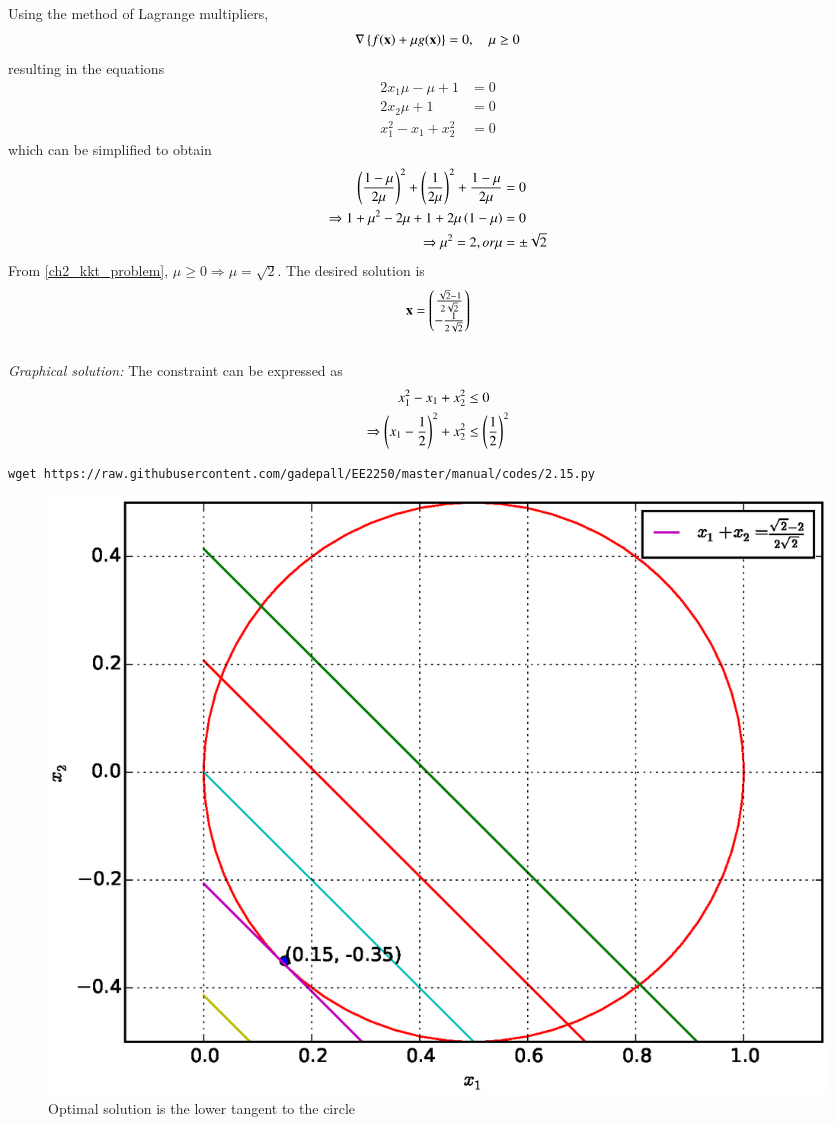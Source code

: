 \documentclass[journal,12pt,twocolumn]{IEEEtran}
\renewcommand\thesection{\arabic{section}}
\begin{document}
\begin{enumerate}[label=\thesection.\arabic*,ref=\thesection.\theenumi]
\solution Using the method of Lagrange multipliers,
%
\begin{align}
\label{ch2_sd_kkt}
\nabla \left\{f(\mathbf{x})  +  \mu g(\mathbf{x}) \right\}= 0 , \quad \mu \ge 0
\end{align}
%
resulting in the equations
%
\begin{align}
2x_1\mu -\mu + 1 &= 0 \\
2x_2\mu + 1 &=0 \\
x_1^2 -x_1 + x_2^2 &= 0 
\end{align}
%
which can be simplified to obtain 
%
\begin{align}
\left(\frac{1-\mu}{2\mu}\right)^2 + \left(\frac{1}{2\mu}\right)^2 + \frac{1-\mu}{2\mu} &= 0 \\
\Rightarrow 1 + \mu^2 -2\mu + 1 + 2\mu\left(1-\mu\right) &= 0 \\
\Rightarrow \mu^2 =2, or \mu &= \pm \sqrt{2} 
\end{align}
%
From \eqref{ch2_kkt_problem},  $\mu \ge 0 \Rightarrow  \mu = \sqrt{2}$. The desired solution is
%
\begin{equation}
\mathbf{x} = 
\begin{pmatrix}
 \frac{\sqrt{2}-1}{2\sqrt{2}} \\
-\frac{1}{2\sqrt{2}} 
\end{pmatrix}
\end{equation}
%
\\
{\em Graphical solution:} The constraint can be expressed as
%
\begin{align}
x_1^2 - x_1 + x_2^2 &\le 0 \\
\Rightarrow \left(x_1 - \frac{1}{2}\right)^2 + x_2^2 & \le \left(\frac{1}{2}\right)^2
\end{align}
%
%	
\begin{lstlisting}
wget https://raw.githubusercontent.com/gadepall/EE2250/master/manual/codes/2.15.py
\end{lstlisting}

%
%
\begin{figure}[!ht]
\centering
\includegraphics[width=\columnwidth]{./figs/2.15.eps}
\caption{ Optimal solution is the lower tangent to the circle}
\label{fig.2.15}	
\end{figure}
%
\end{enumerate}
	
\end{document}

